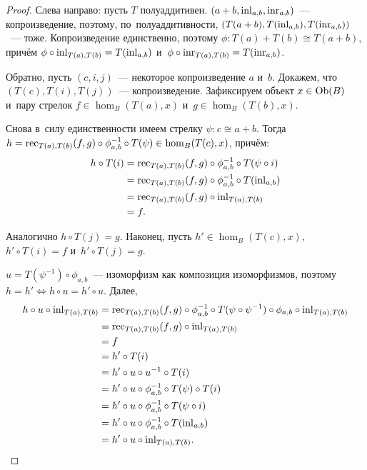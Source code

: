 \documentclass{article}
\begin{document}
\begin{proof}
    Слева направо: пусть $T$ полуаддитивен. $(a + b, \mathrm{inl}_{a, b}, \mathrm{inr}_{a, b})$~— копроизведение,
    поэтому, по~полуаддитивности, $(T(a + b), T(\mathrm{inl}_{a, b}), T(\mathrm{inr}_{a, b}))$~— тоже.
    Копроизведение единственно, поэтому $\phi : T(a) + T(b) \cong T(a + b)$, причём $\phi \circ \mathrm{inl}_{T(a), T(b)} = T(\mathrm{inl}_{a, b})$
    и~$\phi \circ \mathrm{inr}_{T(a), T(b)} = T(\mathrm{inr}_{a, b})$.

    Обратно, пусть $(c, i, j)$~— некоторое копроизведение $a$ и~$b$. Докажем, что $(T(c), T(i), T(j))$~— копроизведение.
    Зафиксируем объект $x \in \mathrm{Ob}(B)$ и~пару стрелок $f \in \hom_B(T(a), x)$ и~$g \in \hom_B(T(b), x)$.

    Снова в~силу единственности имеем стрелку $\psi : c \cong a + b$.
    Тогда $h = \mathrm{rec}_{T(a), T(b)}(f, g) \circ \phi_{a, b}^{-1} \circ T(\psi) \in \hom_B(T(c), x)$, причём:
    \begin{align*}
        h \circ T(i) &= \mathrm{rec}_{T(a), T(b)}(f, g) \circ \phi_{a, b}^{-1} \circ T(\psi \circ i) \\
                     &= \mathrm{rec}_{T(a), T(b)}(f, g) \circ \phi_{a, b}^{-1} \circ T(\mathrm{inl}_{a, b}) \\
                     &= \mathrm{rec}_{T(a), T(b)}(f, g) \circ \mathrm{inl}_{T(a), T(b)} \\
                     &= f.
    \end{align*}

    Аналогично $h \circ T(j) = g$. Наконец, пусть $h' \in \hom_B(T(c), x)$,
    $h' \circ T(i) = f$ и~$h' \circ T(j) = g$.

    $u = T(\psi^{-1}) \circ \phi_{a, b}$~— изоморфизм как композиция изоморфизмов,
    поэтому $h = h' \Leftrightarrow h \circ u = h' \circ u$. Далее,
    \begin{align*}
        h \circ u \circ \mathrm{inl}_{T(a), T(b)} &= \mathrm{rec}_{T(a), T(b)}(f, g) \circ \phi_{a, b}^{-1} \circ T(\psi \circ \psi^{-1}) \circ \phi_{a, b} \circ \mathrm{inl}_{T(a), T(b)} \\
                                                  &= \mathrm{rec}_{T(a), T(b)}(f, g) \circ \mathrm{inl}_{T(a), T(b)} \\
                                                  &= f \\
                                                  &= h' \circ T(i) \\
                                                  &= h' \circ u \circ u^{-1} \circ T(i) \\
                                                  &= h' \circ u \circ \phi_{a,b}^{-1} \circ T(\psi) \circ T(i) \\
                                                  &= h' \circ u \circ \phi_{a,b}^{-1} \circ T(\psi \circ i) \\
                                                  &= h' \circ u \circ \phi_{a,b}^{-1} \circ T(\mathrm{inl}_{a, b}) \\
                                                  &= h' \circ u \circ \mathrm{inl}_{T(a), T(b)}.
    \end{align*}


\end{proof}
\end{document}

